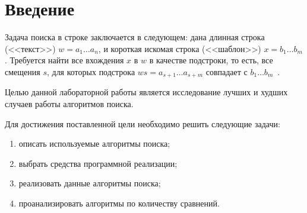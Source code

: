 \chapter*{Введение}
Задача поиска в строке заключается в следующем: дана длинная строка (<<текст>>) $w = a_1 \dots a_n$, и короткая искомая строка (<<шаблон>>) $x = b_1 \dots b_m$. Требуется найти все вхождения $x$ в $w$ в качестве подстроки, то есть, все смещения $s$, для которых подстрока $ws = a_{s + 1} \dots a_{s + m}$ совпадает с $b_1 \dots b_m$~\cite{lectures1}.

Целью данной лабораторной работы является исследование лучших и худших случаев работы алгоритмов поиска.

Для достижения поставленной цели необходимо решить следующие задачи:
\begin{enumerate}
	\item описать используемые алгоритмы поиска;
	\item выбрать средства программной реализации;
	\item реализовать данные алгоритмы поиска;
	\item проанализировать алгоритмы по количеству сравнений.
\end{enumerate}

